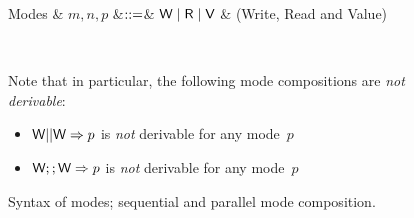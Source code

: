 \documentclass[acmsmall,review,anonymous]{acmart}\settopmatter{printfolios=true,printccs=false,printacmref=false}
\begin{document}
\begin{figure}[htbp]
{
  \centering

\begin{grammar}
  Modes & $m,n,p$ &$\mathrel{::=}$& $\textsf{W} \mathrel{\mid} \textsf{R} \mathrel{\mid} \textsf{V}$ & (Write, Read and Value) 
\end{grammar}

\\[2mm]
}
Note that in particular, the following mode compositions are \emph{not derivable}:
\begin{itemize}
\item $\textsf{W} || \textsf{W} => p$ is \emph{not} derivable for any mode~$p$
\item $\textsf{W} ;; \textsf{W} => p$ is \emph{not} derivable for any mode~$p$
\end{itemize}
\caption{Syntax of modes; sequential and parallel mode composition.}
\label{fig:expr}
\end{figure}
\end{document}
